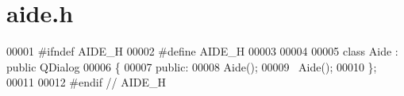 \section{aide.\-h}

\begin{DoxyCode}
00001 \textcolor{preprocessor}{#ifndef AIDE\_H}
00002 \textcolor{preprocessor}{}\textcolor{preprocessor}{#define AIDE\_H}
00003 \textcolor{preprocessor}{}
00004 
00005 \textcolor{keyword}{class }Aide : \textcolor{keyword}{public} QDialog
00006 \{
00007 \textcolor{keyword}{public}:
00008     Aide();
00009     ~Aide();
00010 \};
00011 
00012 \textcolor{preprocessor}{#endif // AIDE\_H}
\end{DoxyCode}
